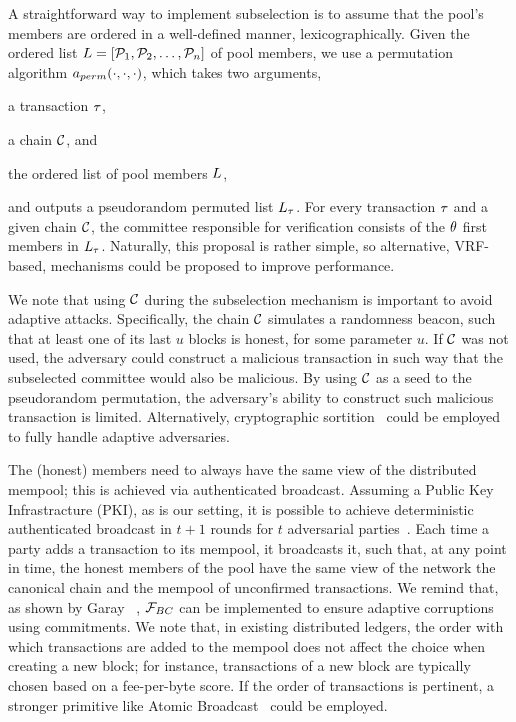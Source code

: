 A straightforward way to implement subselection is to assume that the pool's
members are ordered in a well-defined manner, \eg lexicographically. Given the
ordered list $L = [\mathcal{P}_1, \mathcal{P}_2, \dots, \mathcal{P}_n]$ of pool
members, we use a permutation algorithm $a_{perm}(\cdot, \cdot,
\cdot)$, which takes two arguments,
\begin{inparaenum}[i)]
    \item a transaction $\tau$,
    \item a chain $\mathcal{C}$, and
    \item the ordered list of pool members $L$,
\end{inparaenum}
and outputs a pseudorandom permuted list $L_{\tau}$. For every
transaction $\tau$ and a given chain $\mathcal{C}$, the committee responsible for
verification consists of the $\theta$ first members in
$L_{\tau}$. Naturally, this proposal is rather simple, so alternative,
\eg VRF-based, mechanisms could be proposed to improve performance.

We note that using $\mathcal{C}$ during the subselection mechanism is important to
avoid adaptive attacks. Specifically, the chain $\mathcal{C}$ simulates a randomness
beacon, such that at least one of its last $u$ blocks is honest, for some
parameter $u$. If $\mathcal{C}$ was not used, the adversary could construct a
malicious transaction in such way that the subselected committee would also be
malicious. By using $\mathcal{C}$ as a seed to the pseudorandom permutation, the
adversary's ability to construct such malicious transaction is limited.
Alternatively, cryptographic sortition~\cite{DBLP:conf/sosp/GiladHMVZ17} could
be employed to fully handle adaptive adversaries.

The (honest) members need to always have the same view of the distributed
mempool; this is achieved via authenticated broadcast. Assuming a Public Key
Infrastracture (PKI), as is our setting, it is possible to achieve deterministic
authenticated broadcast in $t + 1$ rounds for $t$ adversarial
parties~\cite{lamport1982byzantine,pease1980reaching,dolev1983authenticated}.
Each time a party adds a transaction to its mempool, it broadcasts it, such
that, at any point in time, the honest members of the pool have the same view
of the network \wrt the canonical chain and the mempool of unconfirmed
transactions. We remind that, as shown by Garay \etal~\cite{PODC:GKKZ11},
${\mathcal{F}}_{BC}$ can be implemented to ensure adaptive corruptions using commitments.
We note that, in existing distributed ledgers, the order with which
transactions are added to the mempool does not affect the choice when creating
a new block; for instance, transactions of a new block are typically chosen
based on a fee-per-byte score. If the order of transactions is pertinent, a
stronger primitive like Atomic Broadcast~\cite{defago2004total} could be
employed.

